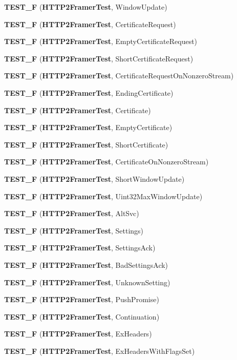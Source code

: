 \begin{DoxyCompactItemize}
\item 
{\bf T\+E\+S\+T\+\_\+F} ({\bf H\+T\+T\+P2\+Framer\+Test}, Window\+Update)
\item 
{\bf T\+E\+S\+T\+\_\+F} ({\bf H\+T\+T\+P2\+Framer\+Test}, Certificate\+Request)
\item 
{\bf T\+E\+S\+T\+\_\+F} ({\bf H\+T\+T\+P2\+Framer\+Test}, Empty\+Certificate\+Request)
\item 
{\bf T\+E\+S\+T\+\_\+F} ({\bf H\+T\+T\+P2\+Framer\+Test}, Short\+Certificate\+Request)
\item 
{\bf T\+E\+S\+T\+\_\+F} ({\bf H\+T\+T\+P2\+Framer\+Test}, Certificate\+Request\+On\+Nonzero\+Stream)
\item 
{\bf T\+E\+S\+T\+\_\+F} ({\bf H\+T\+T\+P2\+Framer\+Test}, Ending\+Certificate)
\item 
{\bf T\+E\+S\+T\+\_\+F} ({\bf H\+T\+T\+P2\+Framer\+Test}, Certificate)
\item 
{\bf T\+E\+S\+T\+\_\+F} ({\bf H\+T\+T\+P2\+Framer\+Test}, Empty\+Certificate)
\item 
{\bf T\+E\+S\+T\+\_\+F} ({\bf H\+T\+T\+P2\+Framer\+Test}, Short\+Certificate)
\item 
{\bf T\+E\+S\+T\+\_\+F} ({\bf H\+T\+T\+P2\+Framer\+Test}, Certificate\+On\+Nonzero\+Stream)
\item 
{\bf T\+E\+S\+T\+\_\+F} ({\bf H\+T\+T\+P2\+Framer\+Test}, Short\+Window\+Update)
\item 
{\bf T\+E\+S\+T\+\_\+F} ({\bf H\+T\+T\+P2\+Framer\+Test}, Uint32\+Max\+Window\+Update)
\item 
{\bf T\+E\+S\+T\+\_\+F} ({\bf H\+T\+T\+P2\+Framer\+Test}, Alt\+Svc)
\item 
{\bf T\+E\+S\+T\+\_\+F} ({\bf H\+T\+T\+P2\+Framer\+Test}, Settings)
\item 
{\bf T\+E\+S\+T\+\_\+F} ({\bf H\+T\+T\+P2\+Framer\+Test}, Settings\+Ack)
\item 
{\bf T\+E\+S\+T\+\_\+F} ({\bf H\+T\+T\+P2\+Framer\+Test}, Bad\+Settings\+Ack)
\item 
{\bf T\+E\+S\+T\+\_\+F} ({\bf H\+T\+T\+P2\+Framer\+Test}, Unknown\+Setting)
\item 
{\bf T\+E\+S\+T\+\_\+F} ({\bf H\+T\+T\+P2\+Framer\+Test}, Push\+Promise)
\item 
{\bf T\+E\+S\+T\+\_\+F} ({\bf H\+T\+T\+P2\+Framer\+Test}, Continuation)
\item 
{\bf T\+E\+S\+T\+\_\+F} ({\bf H\+T\+T\+P2\+Framer\+Test}, Ex\+Headers)
\item 
{\bf T\+E\+S\+T\+\_\+F} ({\bf H\+T\+T\+P2\+Framer\+Test}, Ex\+Headers\+With\+Flags\+Set)
\end{DoxyCompactItemize}


